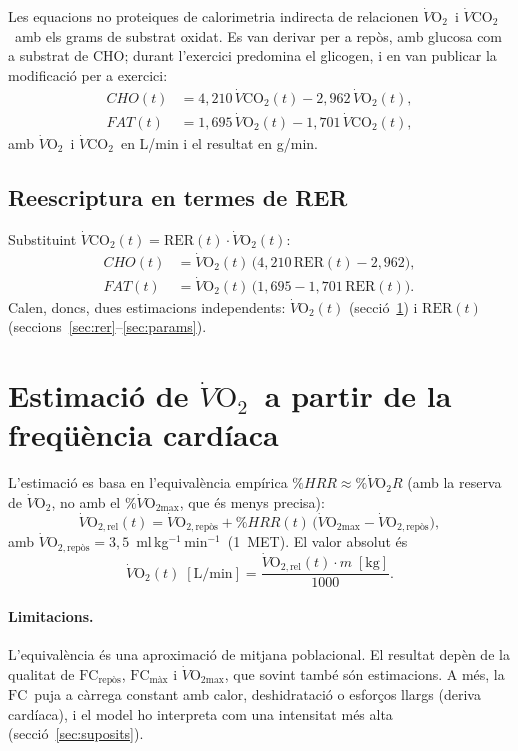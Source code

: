 \documentclass[10pt,a4paper]{article}
\newcommand{\VO}{\ensuremath{\dot V\mathrm{O_2}}}
\newcommand{\VCO}{\ensuremath{\dot V\mathrm{CO_2}}}
\newcommand{\VOmax}{\ensuremath{\dot V\mathrm{O_{2max}}}}
\newcommand{\RER}{\ensuremath{\mathrm{RER}}}
\newcommand{\FC}{\ensuremath{\mathrm{FC}}}
\newcommand{\mlkgmin}{ml\,kg$^{-1}$\,min$^{-1}$}
\begin{document}
Les equacions no proteiques de calorimetria indirecta de \citet{frayn1983}
relacionen \VO\ i \VCO\ amb els grams de substrat oxidat. Es van derivar per a
repòs, amb glucosa com a substrat de CHO; durant l'exercici predomina el glicogen,
i \citet{jeukendrup2005} en van publicar la modificació per a exercici:
\begin{align}
  CHO(t) &= 4{,}210\,\VCO(t)-2{,}962\,\VO(t), \label{eq:jw-cho}\\
  FAT(t) &= 1{,}695\,\VO(t)-1{,}701\,\VCO(t), \label{eq:jw-fat}
\end{align}
amb \VO\ i \VCO\ en L/min i el resultat en g/min.

\subsection{Reescriptura en termes de RER}
Substituint $\VCO(t)=\RER(t)\cdot\VO(t)$:
\begin{align}
  CHO(t) &= \VO(t)\,\bigl(4{,}210\,\RER(t)-2{,}962\bigr), \label{eq:cho-rer}\\
  FAT(t) &= \VO(t)\,\bigl(1{,}695-1{,}701\,\RER(t)\bigr). \label{eq:fat-rer}
\end{align}
Calen, doncs, dues estimacions independents: \VO$(t)$ (secció~\ref{sec:vo2}) i
$\RER(t)$ (seccions~\ref{sec:rer}--\ref{sec:params}).

\section{Estimació de \VO\ a partir de la freqüència cardíaca}\label{sec:vo2}

L'estimació es basa en l'equivalència empírica $\%HRR\approx\%\dot V\mathrm{O_2}R$
\citep{swain1997} (amb la reserva de \VO, no amb el \%\VOmax, que és menys
precisa):
\begin{equation}
  \dot V\mathrm{O_{2,rel}}(t)=\dot V\mathrm{O_{2,repòs}}
  +\%HRR(t)\,\bigl(\VOmax-\dot V\mathrm{O_{2,repòs}}\bigr),
\end{equation}
amb $\dot V\mathrm{O_{2,repòs}}=3{,}5$~\mlkgmin\ (1~MET). El valor absolut és
\begin{equation}
  \VO(t)\;[\mathrm{L/min}]=\frac{\dot V\mathrm{O_{2,rel}}(t)\cdot m\;[\mathrm{kg}]}{1000}.
\end{equation}

\paragraph{Limitacions.} L'equivalència és una aproximació de mitjana
poblacional. El resultat depèn de la qualitat de $\FC_{\mathrm{repòs}}$, $\FC_{\mathrm{màx}}$ i
\VOmax, que sovint també són estimacions. A més, la \FC\ puja a càrrega constant
amb calor, deshidratació o esforços llargs (deriva cardíaca), i el model ho
interpreta com una intensitat més alta (secció~\ref{sec:suposits}).
\end{document}
